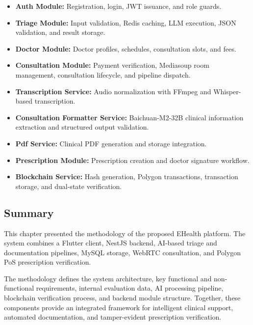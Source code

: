 \begin{itemize}
    \setlength{\itemsep}{1pt}

    \item \textbf{Auth Module:} Registration, login, JWT issuance, and role guards.

    \item \textbf{Triage Module:} Input validation, Redis caching, LLM execution, JSON validation, and result storage.

    \item \textbf{Doctor Module:} Doctor profiles, schedules, consultation slots, and fees.

    \item \textbf{Consultation Module:} Payment verification, Mediasoup room management, consultation lifecycle, and pipeline dispatch.

    \item \textbf{Transcription Service:} Audio normalization with FFmpeg and Whisper-based transcription.

    \item \textbf{Consultation Formatter Service:} Baichuan-M2-32B clinical information extraction and structured output validation.

    \item \textbf{Pdf Service:} Clinical PDF generation and storage integration.

    \item \textbf{Prescription Module:} Prescription creation and doctor signature workflow.

    \item \textbf{Blockchain Service:} Hash generation, Polygon transactions, transaction storage, and dual-state verification.
\end{itemize}

\subsection*{Summary}

This chapter presented the methodology of the proposed EHealth platform. The system combines a Flutter client, NestJS backend, AI-based triage and documentation pipelines, MySQL storage, WebRTC consultation, and Polygon PoS prescription verification.

The methodology defines the system architecture, key functional and non-functional requirements, internal evaluation data, AI processing pipeline, blockchain verification process, and backend module structure. Together, these components provide an integrated framework for intelligent clinical support, automated documentation, and tamper-evident prescription verification.
